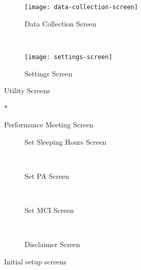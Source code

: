 \begin{figure*}[ht]
    \centering
    \begin{subfigure}[t]{0.4\textwidth}
        \centering
        \texttt{[image: data-collection-screen]}
        \caption{Data Collection Screen}
    \end{subfigure}%
    ~ 
    \begin{subfigure}[t]{0.4\textwidth}
        \centering
        \texttt{[image: settings-screen]}
        \caption{Settings Screen}
    \end{subfigure}
    \caption{Utility Screens}
\end{figure*}

\begin{figure}*
    \centering
    \caption{Performance Meeting Screen}
    \label{fig:performance-meeting-screen}
\end{figure}

\begin{figure*}[ht]
    \centering
    \begin{subfigure}[t]{0.4\textwidth}
        \centering
        \caption{Set Sleeping Hours Screen}
    \end{subfigure}%
    ~ 
    \begin{subfigure}[t]{0.4\textwidth}
        \centering
        \caption{Set PA Screen}
    \end{subfigure}
    ~
     \begin{subfigure}[t]{0.4\textwidth}
        \centering
        \caption{Set MCI Screen}
    \end{subfigure}
     ~
     \begin{subfigure}[t]{0.4\textwidth}
        \centering
        \caption{Disclaimer Screen}
    \end{subfigure}
    \caption{Initial setup screens}
    \label{fig:initial-setup-screens-wireframes}
\end{figure*}

